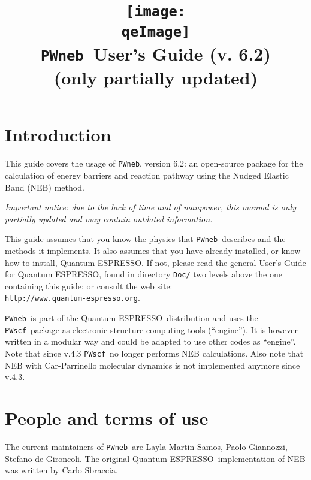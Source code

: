 \documentclass[12pt,a4paper]{article}
\def\version{6.2}
\def\qe{{\sc Quantum ESPRESSO}}
\def\NEB{\texttt{PWneb}} %
\def\PWscf{\texttt{PWscf}}
\begin{document}
 
\author{}
\date{}

\def\qeImage{../../Doc/quantum_espresso.pdf}

\title{
  \texttt{[image: \\qeImage]} \\
  \Huge \NEB\ User's Guide (v. \version)
  \\ \Large (only partially updated)
}

\maketitle

\tableofcontents

\section{Introduction}

This guide covers the usage of \NEB, version \version: 
an open-source package for the calculation of energy barriers 
and reaction pathway using the Nudged Elastic Band (NEB) method.

{\em Important notice: due to the lack of time and of manpower, this
manual is only partially updated and may contain outdated information.}

This guide assumes that you know the physics 
that \NEB\ describes and the methods it implements.
It also assumes  that you have already installed,
or know how to install, \qe. If not, please read
the general User's Guide for \qe, found in 
directory \texttt{Doc/} two levels above the 
one containing this guide; or consult the web site:\\
\texttt{http://www.quantum-espresso.org}.

\NEB \ is part of the \qe \ distribution and uses the \PWscf\
package as electronic-structure computing tools (``engine''). 
It is however written in a modular way and could be adapted 
to use other codes as ``engine''. Note that since v.4.3 \PWscf\ no 
longer performs NEB calculations. Also note that NEB with 
Car-Parrinello molecular dynamics is not implemented anymore since v.4.3.

\section{People and terms of use}
The current maintainers of \NEB\ are Layla Martin-Samos,
Paolo Giannozzi, Stefano de Gironcoli.
The original \qe \ implementation of NEB was written 
by Carlo Sbraccia.
\end{document}
